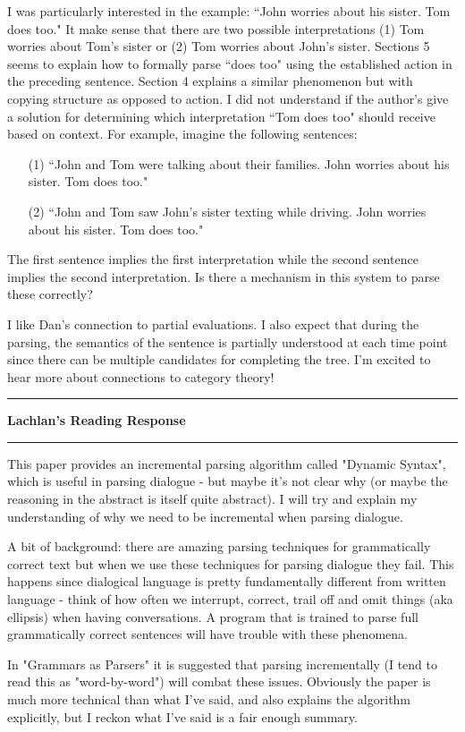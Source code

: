 \documentclass{amsart}
\newcommand{\iam}[1]{
  \vspace{0.25em}
  \hrule
  \vspace{0.25em}
  \textbf{{#1}'s Reading Response}
  \vspace{0.25em}
  \hrule
  \vspace{1em}
}
\begin{document}
I was particularly interested in the example: ``John worries about his sister. Tom does too." It make sense that there are two possible interpretations (1) Tom worries about Tom's sister or (2) Tom worries about John's sister. Sections 5 seems to explain how to formally parse ``does too" using the established action in the preceding sentence. Section 4 explains a similar phenomenon but with copying structure as opposed to action. I did not understand if the author's give a solution for determining which interpretation ``Tom does too" should receive based on context. For example, imagine the following sentences:
\begin{enumerate}
  \item[(1)] ``John and Tom were talking about their families. John worries about his sister. Tom does too."
  \item[(2)] ``John and Tom saw John's sister texting while driving. John worries about his sister. Tom does too."
\end{enumerate}
The first sentence implies the first interpretation while the second sentence implies the second interpretation. Is there a mechanism in this system to parse these correctly?

I like Dan's connection to partial evaluations. I also expect that during the parsing, the semantics of the sentence is partially understood at each time point since there can be multiple candidates for completing the tree. I'm excited to hear more about connections to category theory!

\iam{Lachlan}
This paper provides an incremental parsing algorithm called "Dynamic Syntax", which is useful in parsing dialogue - but maybe it’s not clear why (or maybe the reasoning in the abstract is itself quite abstract). I will try and explain my understanding of why we need to be incremental when parsing dialogue.

A bit of background: there are amazing parsing techniques for grammatically correct text but when we use these techniques for parsing dialogue they fail. This happens since dialogical language is pretty fundamentally different from written language - think of how often we interrupt, correct, trail off and omit things (aka ellipsis) when having conversations. A program that is trained to parse full grammatically correct sentences will have trouble with these phenomena.

In "Grammars as Parsers" it is suggested that parsing incrementally (I tend to read this as "word-by-word") will combat these issues. Obviously the paper is much more technical than what I’ve said, and also explains the algorithm explicitly, but I reckon what I’ve said is a fair enough summary.
\end{document}
